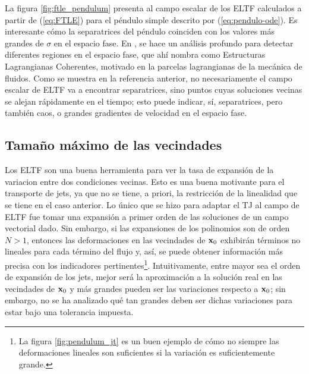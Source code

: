 La figura \ref{fig:ftle_pendulum} presenta al campo escalar de los ELTF calculados a partir de (\ref{eq:FTLE}) para el péndulo simple descrito por (\ref{eq:pendulo-ode}). Es interesante cómo la separatrices del péndulo coinciden con los valores más grandes de $\sigma$ en el espacio fase. En \cite{Haller2011}, se hace un análisis profundo para detectar diferentes regiones en el espacio fase, que ahí nombra como Estructuras Lagrangianas Coherentes, motivado en la parcelas lagrangianas de la mecánica de fluidos. Como se muestra en la referencia anterior, no necesariamente el campo escalar de ELTF va a encontrar separatrices, sino puntos cuyas soluciones vecinas se alejan rápidamente en el tiempo; esto puede indicar, sí, separatrices, pero también caos, o grandes gradientes de velocidad en el espacio fase.


\pagebreak

\subsection{Tamaño máximo de las vecindades}
%

Los ELTF son una buena herramienta para ver la tasa de expansión de la variacion entre dos condiciones vecinas. Esto es una buena motivante para el transporte de jets, ya que no se tiene, a priori, la restricción de la linealidad que se tiene en el caso anterior. Lo único que se hizo para adaptar el TJ al campo de ELTF fue tomar una expansión a primer orden de las soluciones de un campo vectorial dado. Sin embargo, si las expansiones de los polinomios son de orden $N > 1$, entonces las deformaciones en las vecindades de $\mathbf{x}_0$ exhibirán términos no lineales para cada término del flujo y, así, se puede obtener información más precisa con los indicadores pertinentes\footnote{La figura \ref{fig:pendulum_jt} es un buen ejemplo de cómo no siempre las deformaciones lineales son suficientes si la variación es suficientemente grande.}. Intuitivamente, entre mayor sea el orden de expansión de los jets, mejor será la aproximación a la solución real en las vecindades de $\mathbf{x}_0$ y más grandes pueden ser las variaciones respecto a $\mathbf{x}_0$; sin embargo, no se ha analizado qué tan grandes deben ser dichas variaciones para estar bajo una tolerancia impuesta.

